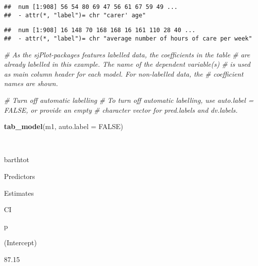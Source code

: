 \documentclass[]{article}
\newenvironment{Shaded}{\begin{snugshade}}{\end{snugshade}}
\newcommand{\KeywordTok}[1]{\textcolor[rgb]{0.13,0.29,0.53}{\textbf{#1}}}
\newcommand{\DataTypeTok}[1]{\textcolor[rgb]{0.13,0.29,0.53}{#1}}
\newcommand{\CommentTok}[1]{\textcolor[rgb]{0.56,0.35,0.01}{\textit{#1}}}
\newcommand{\OtherTok}[1]{\textcolor[rgb]{0.56,0.35,0.01}{#1}}
\newcommand{\OperatorTok}[1]{\textcolor[rgb]{0.81,0.36,0.00}{\textbf{#1}}}
\newcommand{\NormalTok}[1]{#1}
\begin{document}
\begin{Shaded}
\end{Shaded}

\begin{verbatim}
##  num [1:908] 56 54 80 69 47 56 61 67 59 49 ...
##  - attr(*, "label")= chr "carer' age"
\end{verbatim}

\begin{Shaded}
\end{Shaded}

\begin{verbatim}
##  num [1:908] 16 148 70 168 168 16 161 110 28 40 ...
##  - attr(*, "label")= chr "average number of hours of care per week"
\end{verbatim}

\begin{Shaded}
\begin{Highlighting}[]
\CommentTok{# As the sjPlot-packages features labelled data, the coefficients in the table}
\CommentTok{# are already labelled in this example. The name of the dependent variable(s) }
\CommentTok{# is used as main column header for each model. For non-labelled data, the }
\CommentTok{# coefficient names are shown.}
 

\CommentTok{# Turn off automatic labelling}
\CommentTok{# To turn off automatic labelling, use auto.label = FALSE, or provide an empty}
\CommentTok{# character vector for pred.labels and dv.labels.}

\KeywordTok{tab_model}\NormalTok{(m1, }\DataTypeTok{auto.label =} \OtherTok{FALSE}\NormalTok{)}
\end{Highlighting}
\end{Shaded}

~

barthtot

Predictors

Estimates

CI

p

(Intercept)

87.15
\end{document}
